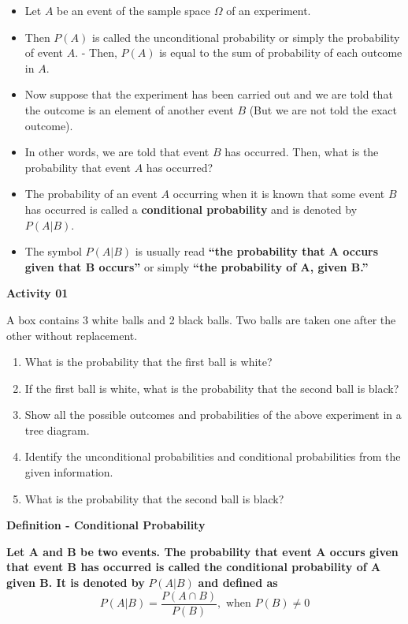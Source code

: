 \documentclass[]{book}
\providecommand{\tightlist}{%
  \setlength{\itemsep}{0pt}\setlength{\parskip}{0pt}}
\begin{document}
\begin{itemize}
\item
  Let \(A\) be an event of the sample space \(\Omega\) of an experiment.
\item
  Then \(P(A)\) is called the unconditional probability or simply the probability of event \(A\). - Then, \(P(A)\) is equal to the sum of probability of each outcome in \(A\).
\item
  Now suppose that the experiment has been carried out and we are told that the outcome is an element of another event \(B\) (But we are not told the exact outcome).
\item
  In other words, we are told that event \(B\) has occurred. Then, what is the probability that event \(A\) has occurred?
\item
  The probability of an event \(A\) occurring when it is known that some event \(B\) has occurred is called a \textbf{conditional probability} and is denoted by \(P(A|B)\).
\item
  The symbol \(P(A|B)\) is usually read \textbf{``the probability that A occurs given that B occurs''} or simply \textbf{``the probability of A, given B.''}
\end{itemize}

\textbf{Activity 01}

A box contains 3 white balls and 2 black balls. Two balls are taken one after the other without replacement.

\begin{enumerate}
\def\labelenumi{\alph{enumi})}
\tightlist
\item
  What is the probability that the first ball is white?
\item
  If the first ball is white, what is the probability that the second ball is black?
\item
  Show all the possible outcomes and probabilities of the above experiment in a tree diagram.
\item
  Identify the unconditional probabilities and conditional probabilities from the given information.
\item
  What is the probability that the second ball is black?
\end{enumerate}

\textbf{Definition - Conditional Probability}

\textbf{Let A and B be two events. The probability that event A occurs given that event B has occurred is called the conditional probability of A given B. It is denoted by} \(P(A|B)\) \textbf{and defined as}
\[P(A|B) = \frac{P(A ∩ B)}{P(B)}, \text{ when }P(B) \neq 0\]
\end{document}
